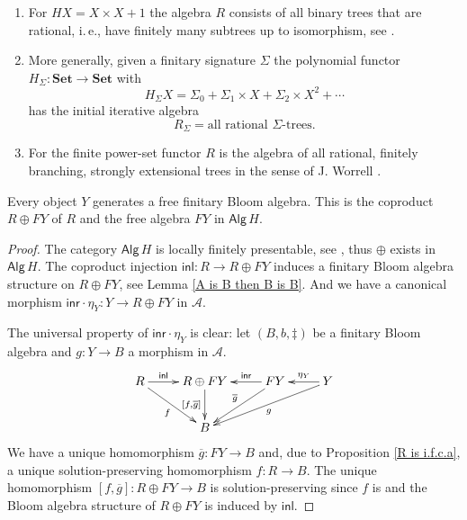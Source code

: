 \documentclass{LMCS}
\theoremstyle{plain}
\theoremstyle{definition}
\numberwithin{equation}{section}
\begin{document}
\begin{exa}\hfill
\begin{enumerate}[label=\({\alph*}]
\item For $HX=X\times X+1$ the algebra $R$ consists of all binary trees that are rational, i.\,e., have finitely many subtrees up to isomorphism, see \cite{ginali}.

\item More generally, given a finitary signature $\Sigma$ the polynomial functor $H_\Sigma:\mathbf{Set}\rightarrow \mathbf{Set}$ with
$$H_\Sigma X=\Sigma_0+\Sigma_1\times X+\Sigma_2\times X^2+\cdots$$
has the initial iterative algebra
$$R_\Sigma=\text{all rational $\Sigma$-trees}.$$

\item For the finite power-set functor $R$ is the algebra of all rational, finitely branching, strongly extensional trees in the sense of J. Worrell \cite{w}.
\end{enumerate}
\end{exa}



\begin{thm}
Every object $Y$ generates a free finitary Bloom algebra. This is the
coproduct $R\oplus FY$ of $R$ and the free algebra $FY$ in $\mathsf{Alg}\,H$.
\end{thm}
\begin{proof}
The category $\mathsf{Alg}\,H$ is locally finitely presentable, see \cite{ar}, thus $\oplus$ exists in $\mathsf{Alg}\,H$. The coproduct injection $\mathsf{inl}:R\rightarrow R\oplus FY$ induces a finitary Bloom algebra structure on $R\oplus FY$, see Lemma  \ref{A is B then B is B}. And we have a canonical morphism $\mathsf{inr}\cdot \eta_Y:Y\rightarrow R\oplus FY$ in $\mathcal A$.

The universal property of $\mathsf{inr}\cdot \eta_Y$ is clear:
let $(B,b,\ddag)$ be a finitary Bloom algebra and $g:Y\rightarrow B$ a morphism in $\mathcal A$.
$$\xymatrix{
R\ar[r]^-{\mathsf{inl}}\ar[rd]_-f&R\oplus FY\ar[d]_-{[f,\overline{g}]}&FY\ar[l]_-{\mathsf{inr}}\ar[ld]_-{\overline{g}}&Y\ar[l]_-{\eta_Y}\ar[lld]^-g\\
&B
}$$
We have a unique homomorphism $\overline g:FY\rightarrow B$ and, due to Proposition \ref{R is i.f.c.a}, a unique solution-preserving homomorphism $f:R\rightarrow B$. The unique homomorphism $[f,\overline g]:R\oplus FY\rightarrow B$ is solution-preserving since $f$ is and the Bloom algebra structure of $R\oplus FY$ is induced by $\mathsf{inl}$.
\end{proof}
\end{document}
